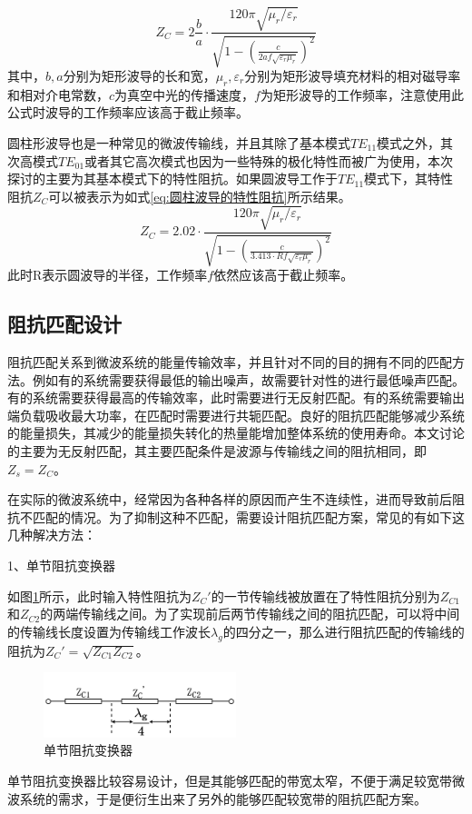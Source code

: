 \documentclass[master]{thesis-uestc}
\begin{document}
\begin{equation}\label{eq:矩形波导的特性阻抗}
    Z_{C}=  2\frac{b}{a} \cdot \frac{120 \pi \sqrt{\mu_r / \varepsilon_r}}{\sqrt{1 - \left( \frac{c}{2af \sqrt{\varepsilon_r \mu_r}} \right)^2}} 
\end{equation}
其中，\(b, a\)分别为矩形波导的长和宽，\(\mu_r, \varepsilon_r\)分别为矩形波导填充材料的相对磁导率和相对介电常数，\(c\)为真空中光的传播速度，\(f\)为矩形波导的工作频率，注意使用此公式时波导的工作频率应该高于截止频率。

圆柱形波导也是一种常见的微波传输线，并且其除了基本模式\(TE_{11}\)模式之外，其次高模式\(TE_{01}\)或者其它高次模式也因为一些特殊的极化特性而被广为使用，本次探讨的主要为其基本模式下的特性阻抗。如果圆波导工作于\(TE_{11}\)模式下，其特性阻抗\(Z_C\)可以被表示为如式\ref{eq:圆柱波导的特性阻抗}所示结果。
\begin{equation}\label{eq:圆柱波导的特性阻抗}
    Z_{C}= 2.02 \cdot \frac{120 \pi \sqrt{\mu_r / \varepsilon_r}}{\sqrt{1 - \left( \frac{c}{3.413 \cdot Rf \sqrt{\varepsilon_r \mu_r}} \right)^2}} 
\end{equation}
此时R表示圆波导的半径，工作频率\(f\)依然应该高于截止频率。
\subsection{阻抗匹配设计}
阻抗匹配关系到微波系统的能量传输效率，并且针对不同的目的拥有不同的匹配方法。例如有的系统需要获得最低的输出噪声，故需要针对性的进行最低噪声匹配。有的系统需要获得最高的传输效率，此时需要进行无反射匹配。有的系统需要输出端负载吸收最大功率，在匹配时需要进行共轭匹配。良好的阻抗匹配能够减少系统的能量损失，其减少的能量损失转化的热量能增加整体系统的使用寿命。本文讨论的主要为无反射匹配，其主要匹配条件是波源与传输线之间的阻抗相同，即\(Z_s=Z_C\)。

在实际的微波系统中，经常因为各种各样的原因而产生不连续性，进而导致前后阻抗不匹配的情况。为了抑制这种不匹配，需要设计阻抗匹配方案，常见的有如下这几种解决方法：

1、单节阻抗变换器

如图\ref{fig:单节阻抗变换器}所示，此时输入特性阻抗为\(Z_C'\)的一节传输线被放置在了特性阻抗分别为\(Z_{C1}\)和\(Z_{C2}\)的两端传输线之间。为了实现前后两节传输线之间的阻抗匹配，可以将中间的传输线长度设置为传输线工作波长\(\lambda_g\)的四分之一，那么进行阻抗匹配的传输线的阻抗为\(Z_C'=\sqrt{Z_{C1} Z_{C2}}\)。
\begin{figure}[!htb]
    \centering
    \includegraphics[width=0.5\textwidth]{pic/chapter2/单节阻抗变换器.png}
    \caption{单节阻抗变换器}
    \label{fig:单节阻抗变换器}
\end{figure}
单节阻抗变换器比较容易设计，但是其能够匹配的带宽太窄，不便于满足较宽带微波系统的需求，于是便衍生出来了另外的能够匹配较宽带的阻抗匹配方案。
\end{document}
